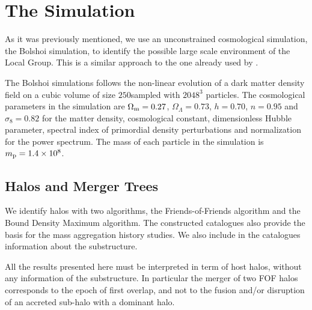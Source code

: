 \documentclass[usenatbib]{latex/mn2e}
\begin{document}
\section{The Simulation}
\label{sec:the_simulation}


As it was previously mentioned, we use an unconstrained cosmological 
simulation, the Bolshoi simulation, to identify the possible large scale 
environment of the Local Group. This is a similar approach to the one already 
used by .



The Bolshoi simulations follows the non-linear evolution of a dark matter 
density field on a cubic volume of size $250$\hMpc sampled with $2048^3$ 
particles. The cosmological parameters in the simulation are 
$\Omega_{\rm m}=0.27$, $\Omega_{\Lambda}=0.73$, $h=0.70$, $n=0.95$ and 
$\sigma_{8}=0.82$ for the matter density, cosmological constant, 
dimensionless Hubble parameter, spectral index of primordial density 
perturbations and normalization for the power spectrum. The mass of each 
particle in the simulation is $m_{\rm p}=1.4\times 10^{8}$\hMsun.



\subsection{Halos and Merger Trees}
\label{subsec:halos_merger_trees}



We identify halos with two algorithms, the Friends-of-Friends  algorithm and the Bound Density Maximum algorithm. The 
constructed catalogues also provide the basis for the mass aggregation 
history studies. We also include in the catalogues information about the 
substructure.



All the results presented here must be interpreted in term of host halos, 
without any information of the substructure. In particular the merger of 
two FOF halos corresponds to the epoch of first overlap, and not to the 
fusion and/or disruption of an accreted sub-halo with a dominant halo. 
\end{document}
